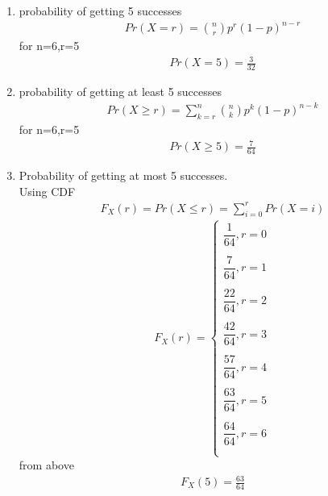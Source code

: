 \documentclass[journal,12pt,twocolumn]{IEEEtran}
\begin{document}
\begin{enumerate}
    \item probability of getting 5 successes
    \begin{align}
        Pr(X=r)= \binom{n}{r} p^{r}(1-p)^{n-r}
    \end{align}
    for n=6,r=5\\
    \begin{align}
        Pr(X=5)=\frac{3}{32}
    \end{align}
    \item probability of getting at least 5 successes
    \begin{align}
        Pr(X\geq r)=\sum ^{n}_{k=r} \binom{n}{k} p^k (1-p)^{n-k}
    \end{align}
    for n=6,r=5
    \begin{align}
        Pr(X\geq5)=\frac{7}{64}
    \end{align}
    \item Probability of getting at most 5 successes.\\
 Using CDF\\
 \begin{align}
     F_{X}(r)=Pr(X\leq r)=\sum^{r}_{i=0}Pr(X=i)
 \end{align}
 $$
     F_{X}(r)= \begin{cases}
     \dfrac{1}{64} ,  r=0\\
     \\
     \dfrac{7}{64} , r=1\\
     \\
     \dfrac{22}{64} , r=2\\
     \\
     \dfrac{42}{64} , r=3\\
     \\
     \dfrac{57}{64} ,r=4\\
     \\
     \dfrac{63}{64} , r=5\\
     \\
     \dfrac{64}{64} , r=6\\
     \\
     
     
     \end{cases}
 $$
     from above
    \begin{align}
        F_{X}(5)=\frac{63}{64}
    \end{align}
    

\end{enumerate}
\end{document}
